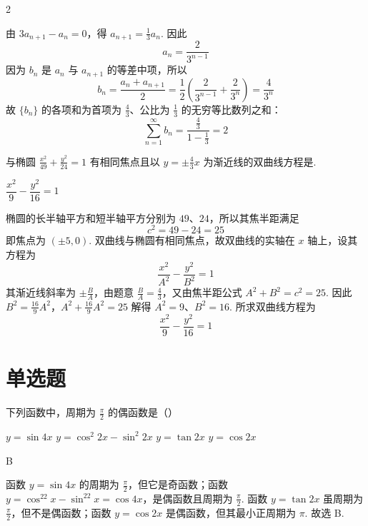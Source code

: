 \begin{answer}
2
\end{answer}

\begin{solution}
由 \(3a_{n+1}-a_n=0\)，得 \(a_{n+1}=\frac13a_n\). 因此
\[
a_n=\frac{2}{3^{n-1}}
\]
因为 \(b_n\) 是 \(a_n\) 与 \(a_{n+1}\) 的等差中项，所以
\[
b_n=\frac{a_n+a_{n+1}}2=\frac12\left(\frac{2}{3^{n-1}}+\frac{2}{3^n}\right)=\frac4{3^n}
\]
故 \(\{b_n\}\) 的各项和为首项为 \(\frac43\)、公比为 \(\frac13\) 的无穷等比数列之和：
\[
\sum_{n=1}^{\infty}b_n=\frac{\frac43}{1-\frac13}=2
\]
\end{solution}

\begin{problem}
与椭圆 \(\frac{x^2}{49} + \frac{y^2}{24} = 1\) 有相同焦点且以 \(y = \pm \frac{4}{3} x\) 为渐近线的双曲线方程是\fillinblank{}.
\end{problem}

\begin{answer}
\(\dfrac{x^2}{9}-\dfrac{y^2}{16}=1\)
\end{answer}

\begin{solution}
椭圆的长半轴平方和短半轴平方分别为 \(49\)、\(24\)，所以其焦半距满足
\[
c^2=49-24=25
\]
即焦点为 \((\pm5,0)\). 双曲线与椭圆有相同焦点，故双曲线的实轴在 \(x\) 轴上，设其方程为
\[
\frac{x^2}{A^2}-\frac{y^2}{B^2}=1
\]
其渐近线斜率为 \(\pm \frac{B}{A}\)，由题意 \(\frac{B}{A}=\frac{4}{3}\)，又由焦半距公式 \(A^2+B^2=c^2=25\). 因此
\(B^2=\frac{16}{9}A^2\)，\(A^2+\frac{16}{9}A^2=25\)
解得 \(A^2=9\)、\(B^2=16\). 所求双曲线方程为
\[
\frac{x^2}{9}-\frac{y^2}{16}=1
\]
\end{solution}

\section{单选题}

\begin{problem}
下列函数中，周期为 \(\frac{\pi}{2}\) 的偶函数是（\quad）

\choices
    {\(y = \sin 4x \)}
    {\(y = \cos^2 2x - \sin^2 2x \)}
    {\(y = \tan 2x \)}
    {\(y = \cos 2x \)}
\end{problem}

\begin{answer}
B
\end{answer}

\begin{solution}
函数 \(y=\sin4x\) 的周期为 \(\frac\pi2\)，但它是奇函数；函数
\(y=\cos^22x-\sin^22x=\cos4x\)，是偶函数且周期为 \(\frac\pi2\). 函数 \(y=\tan2x\) 虽周期为 \(\frac\pi2\)，但不是偶函数；函数 \(y=\cos2x\) 是偶函数，但其最小正周期为 \(\pi\). 故选 B.
\end{solution}

